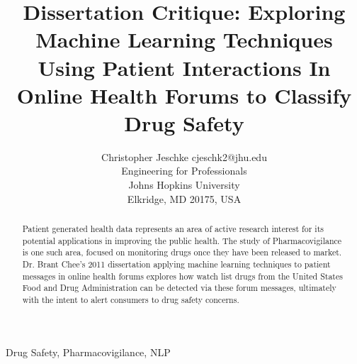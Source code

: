 \documentclass[twoside,11pt]{article}
\begin{document}
\title{Dissertation Critique: Exploring Machine Learning Techniques Using Patient
      Interactions In Online Health Forums to Classify Drug Safety}

\author{\name Christopher Jeschke \email cjeschk2@jhu.edu \\
       \addr Engineering for Professionals\\
       Johns Hopkins University\\
       Elkridge, MD 20175, USA}


\maketitle


\singlespacing

\begin{abstract}%
  Patient generated health data represents an area of active research interest
  for its potential applications in improving the public health. The study of
  Pharmacovigilance is one such area, focused on monitoring drugs once they have been
  released to market. Dr. Brant Chee's 2011 dissertation applying machine learning
  techniques to patient messages in online health forums explores how watch
  list drugs from the United States Food and Drug Administration can be detected
  via these forum messages, ultimately with the intent to alert consumers to drug
  safety concerns.
\end{abstract}

\begin{keywords}
  Drug Safety, Pharmacovigilance, NLP
\end{keywords}
\end{document}

